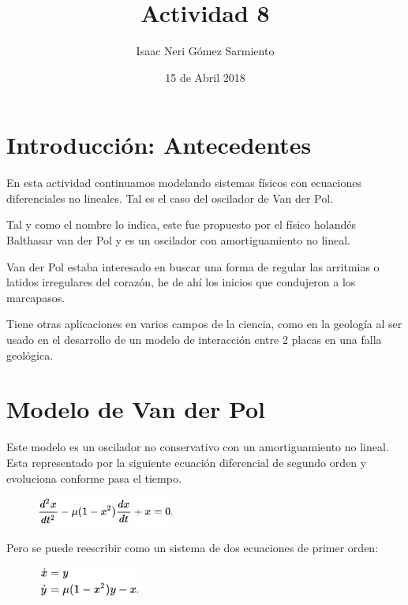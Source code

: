\documentclass[a4paper]{article}
\title{Actividad 8}
\author{Isaac Neri Gómez Sarmiento}
\date{15 de Abril 2018}
\begin{document}
\maketitle

\section{Introducción: Antecedentes}

En esta actividad continuamos modelando sistemas físicos con ecuaciones diferenciales no lineales. Tal es el caso del oscilador de Van der Pol.

Tal y como el nombre lo indica, este fue propuesto por el físico holandés Balthasar van der Pol y es un oscilador con amortiguamiento no lineal.

Van der Pol estaba interesado en buscar una forma de regular las arritmias o  latidos irregulares del corazón, he de ahí los inicios que condujeron a los marcapasos. 

Tiene otras aplicaciones en varios campos de la ciencia, como en la geología al ser usado en el desarrollo de un modelo de interacción entre 2 placas en una falla geológica.




\section{Modelo de Van der Pol}

Este modelo es un oscilador no conservativo con un amortiguamiento no lineal. Esta representado por la siguiente ecuación diferencial de segundo orden y evoluciona conforme pasa el tiempo.


\begin{figure}[ht!]
\centering
\includegraphics[width=0.4\textwidth]{Eq_dif1.PNG}
\end{figure}


Pero se puede reescribir como un sistema de dos ecuaciones de primer orden:


\begin{figure}[ht!]
\centering
\includegraphics[width=0.30\textwidth]{Eq_dif2.PNG}
\end{figure}
\end{document}
